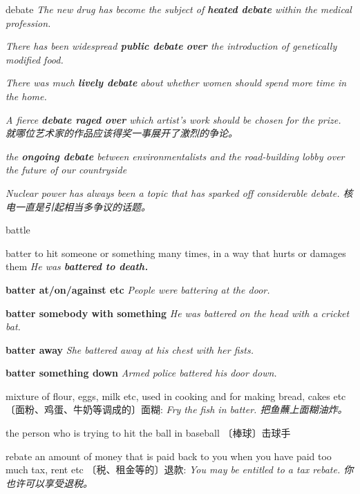 \begin{DefWord}{debate}
\textit{The new drug has become the subject of \textbf{heated debate} within the medical profession.}

\textit{There has been widespread \textbf{public debate} \textbf{over} the introduction of genetically modified food.}

\textit{There was much \textbf{lively debate} about whether women should spend more time in the home.}

\textit{A fierce \textbf{debate raged over} which artist's work should be chosen for the prize. 就哪位艺术家的作品应该得奖一事展开了激烈的争论。}

\textit{the \textbf{ongoing debate} between environmentalists and the road-building lobby over the future of our countryside}

\textit{Nuclear power has always been a topic that has sparked off considerable debate. 核电一直是引起相当多争议的话题。}



\end{DefWord}


\begin{DefWord}{battle}
\end{DefWord}

\begin{DefWord}{batter}
    to hit someone or something many times, in a way that hurts or damages them
    \textit{He was \textbf{battered to death.}}

    \textbf{batter at/on/against etc}
    \textit{People were battering at the door.}

    \textbf{batter somebody with something}
    \textit{He was battered on the head with a cricket bat.}

    \textbf{batter away}
    \textit{She battered away at his chest with her fists.}

    \textbf{batter something down}
    \textit{Armed police battered his door down.}

    mixture of flour, eggs, milk etc, used in cooking and for making bread, cakes etc 〔面粉、鸡蛋、牛奶等调成的〕面糊:
    \textit{Fry the fish in batter. 把鱼蘸上面糊油炸。}

    the person who is trying to hit the ball in baseball 〔棒球〕击球手
\end{DefWord}


\begin{DefWord}{rebate}
    an amount of money that is paid back to you when you have paid too much tax, rent etc 〔税、租金等的〕退款:
 \textit{You may be entitled to a tax rebate. 你也许可以享受退税。}
\end{DefWord}

